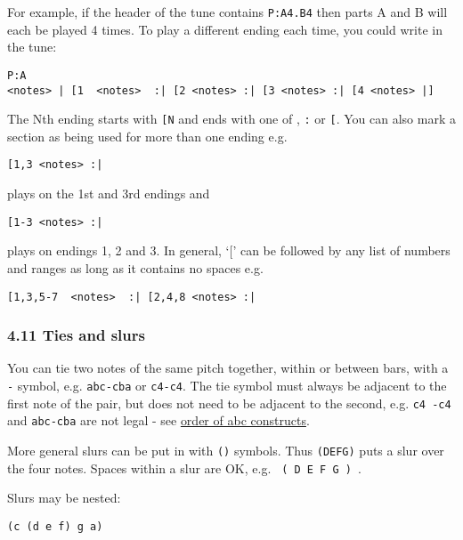 For example, if the header of the tune contains \texttt{P:A4.B4} then
parts A and B will each be played 4 times. To play a different ending
each time, you could write in the tune:

\begin{verbatim}
P:A
<notes> | [1  <notes>  :| [2 <notes> :| [3 <notes> :| [4 <notes> |]
\end{verbatim}

The Nth ending starts with \texttt{{[}N} and ends with one of
\texttt{\textbar{}\textbar{}}, \texttt{:\textbar{}}
\texttt{\textbar{}{]}} or \texttt{{[}\textbar{}}. You can also mark a
section as being used for more than one ending e.g.

\begin{verbatim}
[1,3 <notes> :|
\end{verbatim}

plays on the 1st and 3rd endings and

\begin{verbatim}
[1-3 <notes> :|
\end{verbatim}

plays on endings 1, 2 and 3. In general, `{[}' can be followed by any
list of numbers and ranges as long as it contains no spaces e.g.

\begin{verbatim}
[1,3,5-7  <notes>  :| [2,4,8 <notes> :|
\end{verbatim}

\hypertarget{ties_and_slurs}{\subsubsection{4.11 Ties and
slurs}\label{ties_and_slurs}}

You can tie two notes of the same pitch together, within or between
bars, with a \texttt{-} symbol, e.g. \texttt{abc-\textbar{}cba} or
\texttt{c4-c4}. The tie symbol must always be adjacent to the first note
of the pair, but does not need to be adjacent to the second, e.g.
\texttt{c4\ -c4} and \texttt{abc\textbar{}-cba} are not legal - see
\protect\hyperlink{order_of_abc_constructs}{order of abc constructs}.

More general slurs can be put in with \texttt{()} symbols. Thus
\texttt{(DEFG)} puts a slur over the four notes. Spaces within a slur
are OK, e.g. \texttt{\ (\ D\ E\ F\ G\ )\ }.

Slurs may be nested:

\begin{verbatim}
(c (d e f) g a)
\end{verbatim}

